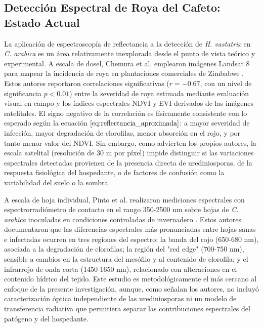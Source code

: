 \documentclass[12pt, a4paper]{article}
\begin{document}
	\subsection{Detección Espectral de Roya del Cafeto: Estado Actual}
	
	La aplicación de espectroscopía de reflectancia a la detección de \textit{H. vastatrix} en \textit{C. arabica} es un área relativamente inexplorada desde el punto de vista teórico y experimental. A escala de dosel, Chemura et al. emplearon imágenes Landsat 8 para mapear la incidencia de roya en plantaciones comerciales de Zimbabwe \parencite{Chemura2017}. Estos autores reportaron correlaciones significativas ($r = -0.67$, con un nivel de significancia $p < 0.01$) entre la severidad de roya estimada mediante evaluación visual en campo y los índices espectrales NDVI y EVI derivados de las imágenes satelitales. El signo negativo de la correlación es físicamente consistente con lo esperado según la ecuación $\ref{eq:reflectancia_aproximada}$: a mayor severidad de infección, mayor degradación de clorofilas, menor absorción en el rojo, y por tanto menor valor del NDVI. Sin embargo, como advierten los propios autores, la escala satelital (resolución de 30 m por píxel) impide distinguir si las variaciones espectrales detectadas provienen de la presencia directa de urediniosporas, de la respuesta fisiológica del hospedante, o de factores de confusión como la variabilidad del suelo o la sombra.
	
	A escala de hoja individual, Pinto et al. realizaron mediciones espectrales con espectrorradiómetro de contacto en el rango 350-2500 nm sobre hojas de \textit{C. arabica} inoculadas en condiciones controladas de invernadero \parencite{Pinto2021}. Estos autores documentaron que las diferencias espectrales más pronunciadas entre hojas sanas e infectadas ocurren en tres regiones del espectro: la banda del rojo (650-680 nm), asociada a la degradación de clorofilas; la región del "red edge" (700-750 nm), sensible a cambios en la estructura del mesófilo y al contenido de clorofila; y el infrarrojo de onda corta (1450-1650 nm), relacionado con alteraciones en el contenido hídrico del tejido. Este estudio es metodológicamente el más cercano al enfoque de la presente investigación, aunque, como señalan los autores, no incluyó caracterización óptica independiente de las urediniosporas ni un modelo de transferencia radiativa que permitiera separar las contribuciones espectrales del patógeno y del hospedante.
	
\end{document}
